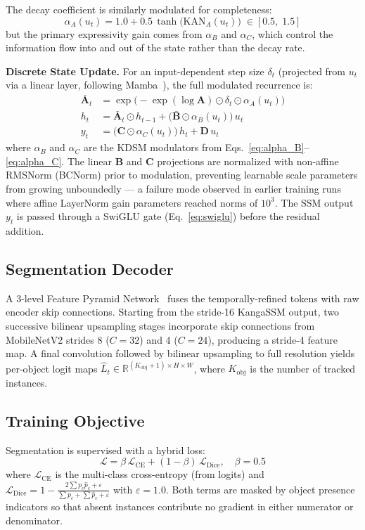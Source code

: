 \documentclass[sigconf]{acmart}
\begin{document}
The decay coefficient is similarly modulated for completeness:
\begin{equation}
    \alpha_A(u_t) = 1.0 + 0.5\,\tanh\!\bigl(\mathrm{KAN}_A(u_t)\bigr) \;\in [0.5,\; 1.5]
\end{equation}
but the primary expressivity gain comes from $\alpha_B$ and $\alpha_C$, which control the information flow into and out of the state rather than the decay rate.

\textbf{Discrete State Update.} For an input-dependent step size $\delta_t$ (projected from $u_t$ via a linear layer, following Mamba~\cite{gu2024mamba}), the full modulated recurrence is:
\begin{align}
    \bar{\mathbf{A}}_t &= \exp\!\bigl(-\exp(\log\mathbf{A}) \odot \delta_t \odot \alpha_A(u_t)\bigr) \\
    h_t &= \bar{\mathbf{A}}_t \odot h_{t-1} + \bigl(\bar{\mathbf{B}} \odot \alpha_B(u_t)\bigr)\, u_t \label{eq:state_update}\\
    y_t &= \bigl(\mathbf{C} \odot \alpha_C(u_t)\bigr)\, h_t + \mathbf{D}\, u_t \label{eq:readout}
\end{align}
where $\alpha_B$ and $\alpha_C$ are the KDSM modulators from Eqs.~\ref{eq:alpha_B}--\ref{eq:alpha_C}. The linear $\mathbf{B}$ and $\mathbf{C}$ projections are normalized with non-affine RMSNorm (BCNorm) prior to modulation, preventing learnable scale parameters from growing unboundedly — a failure mode observed in earlier training runs where affine LayerNorm gain parameters reached norms of $10^3$. The SSM output $y_t$ is passed through a SwiGLU gate (Eq.~\ref{eq:swiglu}) before the residual addition.

\subsection{Segmentation Decoder}
A 3-level Feature Pyramid Network~\cite{lin2017fpn} fuses the temporally-refined tokens with raw encoder skip connections. Starting from the stride-16 KangaSSM output, two successive bilinear upsampling stages incorporate skip connections from MobileNetV2 strides 8 ($C=32$) and 4 ($C=24$), producing a stride-4 feature map. A final convolution followed by bilinear upsampling to full resolution yields per-object logit maps $\hat{L}_t \in \mathbb{R}^{(K_\text{obj}+1)\times H \times W}$, where $K_\text{obj}$ is the number of tracked instances.

\subsection{Training Objective}
Segmentation is supervised with a hybrid loss:
\begin{equation}
    \mathcal{L} = \beta\,\mathcal{L}_\text{CE} + (1-\beta)\,\mathcal{L}_\text{Dice}, \quad \beta = 0.5
\end{equation}
where $\mathcal{L}_\text{CE}$ is the multi-class cross-entropy (from logits) and $\mathcal{L}_\text{Dice} = 1 - \frac{2\sum p_c\hat{p}_c + \varepsilon}{\sum p_c + \sum \hat{p}_c + \varepsilon}$ with $\varepsilon=1.0$. Both terms are masked by object presence indicators so that absent instances contribute no gradient in either numerator or denominator.
\end{document}
